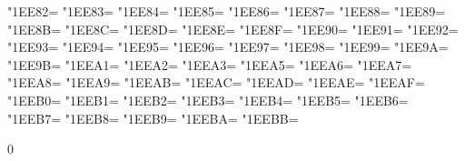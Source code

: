 \XeTeXcharclass"1EE82=\KclassArabU
\XeTeXcharclass"1EE83=\KclassArabU
\XeTeXcharclass"1EE84=\KclassArabU
\XeTeXcharclass"1EE85=\KclassArabU
\XeTeXcharclass"1EE86=\KclassArabU
\XeTeXcharclass"1EE87=\KclassArabU
\XeTeXcharclass"1EE88=\KclassArabU
\XeTeXcharclass"1EE89=\KclassArabU
\XeTeXcharclass"1EE8B=\KclassArabU
\XeTeXcharclass"1EE8C=\KclassArabU
\XeTeXcharclass"1EE8D=\KclassArabU
\XeTeXcharclass"1EE8E=\KclassArabU
\XeTeXcharclass"1EE8F=\KclassArabU
\XeTeXcharclass"1EE90=\KclassArabU
\XeTeXcharclass"1EE91=\KclassArabU
\XeTeXcharclass"1EE92=\KclassArabU
\XeTeXcharclass"1EE93=\KclassArabU
\XeTeXcharclass"1EE94=\KclassArabU
\XeTeXcharclass"1EE95=\KclassArabU
\XeTeXcharclass"1EE96=\KclassArabU
\XeTeXcharclass"1EE97=\KclassArabU
\XeTeXcharclass"1EE98=\KclassArabU
\XeTeXcharclass"1EE99=\KclassArabU
\XeTeXcharclass"1EE9A=\KclassArabU
\XeTeXcharclass"1EE9B=\KclassArabU
\XeTeXcharclass"1EEA1=\KclassArabU
\XeTeXcharclass"1EEA2=\KclassArabU
\XeTeXcharclass"1EEA3=\KclassArabU
\XeTeXcharclass"1EEA5=\KclassArabU
\XeTeXcharclass"1EEA6=\KclassArabU
\XeTeXcharclass"1EEA7=\KclassArabU
\XeTeXcharclass"1EEA8=\KclassArabU
\XeTeXcharclass"1EEA9=\KclassArabU
\XeTeXcharclass"1EEAB=\KclassArabU
\XeTeXcharclass"1EEAC=\KclassArabU
\XeTeXcharclass"1EEAD=\KclassArabU
\XeTeXcharclass"1EEAE=\KclassArabU
\XeTeXcharclass"1EEAF=\KclassArabU
\XeTeXcharclass"1EEB0=\KclassArabU
\XeTeXcharclass"1EEB1=\KclassArabU
\XeTeXcharclass"1EEB2=\KclassArabU
\XeTeXcharclass"1EEB3=\KclassArabU
\XeTeXcharclass"1EEB4=\KclassArabU
\XeTeXcharclass"1EEB5=\KclassArabU
\XeTeXcharclass"1EEB6=\KclassArabU
\XeTeXcharclass"1EEB7=\KclassArabU
\XeTeXcharclass"1EEB8=\KclassArabU
\XeTeXcharclass"1EEB9=\KclassArabU
\XeTeXcharclass"1EEBA=\KclassArabU
\XeTeXcharclass"1EEBB=\KclassArabU

 0{\intercharspace}
\XeTeXinterchartoks {}
\XeTeXinterchartoks {}
 \KclassNum{\intercharspace}
\XeTeXinterchartoks \KclassCM \KclassNum{\intercharspace}
\XeTeXinterchartoks \KclassCM \KclassArabL{\intercharspace}
\XeTeXinterchartoks \KclassArabD \KclassArabL{\intercharspace}
\XeTeXinterchartoks \KclassArabL \KclassArabL{\intercharspace}
\XeTeXinterchartoks \KclassArabR \KclassArabL{\intercharspace}
\XeTeXinterchartoks \KclassArabR \KclassArabD{\intercharspace}
\XeTeXinterchartoks \KclassArabR \KclassArabR{\intercharspace}
\XeTeXinterchartoks \KclassCM \KclassArabU{\intercharspace}
\XeTeXinterchartoks \KclassArabU \KclassArabL{\intercharspace}
\XeTeXinterchartoks \KclassArabU \KclassArabR{\intercharspace}
\XeTeXinterchartoks \KclassArabU \KclassArabD{\intercharspace}
\XeTeXinterchartoks \KclassArabU \KclassArabU{\intercharspace}
\XeTeXinterchartoks \KclassNum \KclassArabL{\intercharspace}
\XeTeXinterchartoks \KclassNum \KclassArabR{\intercharspace}
\XeTeXinterchartoks \KclassNum \KclassArabD{\intercharspace}
\XeTeXinterchartoks \KclassNum \KclassArabU{\intercharspace}
